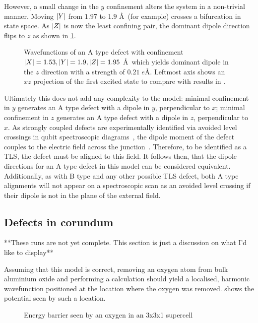 However, a small change in the $y$ confinement alters the system in a non-trivial manner.
Moving $\lvert Y\rvert$ from $1.97$ to $1.9$ \AA\ (for example) crosses a bifurcation in state space.
As $\lvert Z\rvert$ is now the least confining pair, the dominant dipole direction flips to $z$ as shown in \cref{fig:atypez}.

\begin{figure}[htb]
  \resizebox{\textwidth}{!}{}
  \caption{\label{fig:atypez}Wavefunctions of an A type defect with confinement $\lvert X\rvert = 1.53, \lvert Y\rvert = 1.9, \lvert Z\rvert = 1.95$ \AA\ which yields dominant dipole in the $z$ direction with a strength of $0.21 \; e$\AA. Leftmost axis shows an $xz$ projection of the first excited state to compare with  results in .}
\end{figure}

Ultimately this does not add any complexity to the model: minimal confinement in $y$ generates an A type defect with a dipole in $y$, perpendicular to $x$; minimal confinement in $z$ generates an A type defect with a dipole in $z$, perpendicular to $x$.
As strongly coupled defects are experimentally identified via avoided level crossings in qubit spectroscopic diagrams~\cite{Lisenfeld2010}, the dipole moment of the defect couples to the electric field across the junction~\cite{Martinis2005}.
Therefore, to be identified as a TLS, the defect must be aligned to this field.
It follows then, that the dipole directions for an A type defect in this model can be considered equivalent.
Additionally, as with B type and any other possible TLS defect, both A type alignments will not appear on a spectroscopic scan as an avoided level crossing if their dipole is not in the plane of the external field.

\subsection{Defects in corundum}\label{sec:corundum}
**These runs are not yet complete. This section is just a discussion on what I'd like to display**

Assuming that this model is correct, removing an oxygen atom from bulk aluminium oxide and performing a calculation should yield a localised, harmonic wavefunction positioned at the location where the oxygen was removed.  shows the potential seen by such a location.

\begin{figure}[htb]
\caption{\label{fig:clustpot}Energy barrier seen by an oxygen in an  3x3x1 supercell}
\end{figure}

